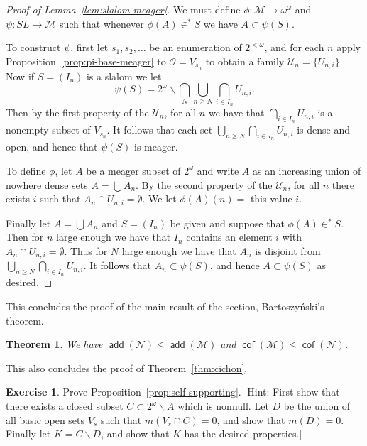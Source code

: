 \documentclass[11pt,oneside]{amsbook}
\newcommand{\Null}{\mathcal N}
\newcommand{\Meager}{\mathcal M}
\DeclareMathOperator{\add}{\mathsf{add}}
\DeclareMathOperator{\cof}{\mathsf{cof}}
\theoremstyle{definition}
\newtheorem{exercise}{Exercise}[section]
\theoremstyle{plain}
\newtheorem{theorem}{Theorem}[section]
\theoremstyle{definition}
\theoremstyle{remark}
\numberwithin{equation}{section}
\numberwithin{figure}{section}
\begin{document}
\begin{proof}[Proof of Lemma~\ref{lem:slalom-meager}]
  We must define $\phi\colon\Meager\to\omega^\omega$ and $\psi\colon SL\to\Meager$ such that whenever $\phi(A)\in^*S$ we have $A\subset\psi(S)$.

  To construct $\psi$, first let $s_1,s_2,\ldots$ be an enumeration of $2^{<\omega}$, and for each $n$ apply Proposition~\ref{prop:pi-base-meager} to $\mathcal O=V_{s_n}$ to obtain a family $\mathcal U_n=\{U_{n,i}\}$. Now if $S=(I_n)$ is a slalom we let
  \[\psi(S)=2^\omega\smallsetminus\bigcap_N\bigcup_{n\geq N}\bigcap_{i\in I_n}U_{n,i}\text{.}
  \]
  Then by the first property of the $\mathcal U_n$, for all $n$ we have that $\bigcap_{i\in I_n}U_{n,i}$ is a nonempty subset of $V_{s_n}$. It follows that each set $\bigcup_{n\geq N}\bigcap_{i\in I_n}U_{n,i}$ is dense and open, and hence that $\psi(S)$ is meager.

  To define $\phi$, let $A$ be a meager subset of $2^\omega$ and write $A$ as an increasing union of nowhere dense sets $A=\bigcup A_n$. By the second property of the $\mathcal U_n$, for all $n$ there exists $i$ such that $A_n\cap U_{n,i}=\emptyset$. We let $\phi(A)(n)=$ this value $i$.

  Finally let $A=\bigcup A_n$ and $S=(I_n)$ be given and suppose that $\phi(A)\in^*S$. Then for $n$ large enough we have that $I_n$ contains an element $i$ with $A_n\cap U_{n,i}=\emptyset$. Thus for $N$ large enough we have that $A_n$ is disjoint from $\bigcup_{n\geq N}\bigcap_{i\in I_n}U_{n,i}$. It follows that $A_n\subset\psi(S)$, and hence $A\subset\psi(S)$ as desired.
\end{proof}

This concludes the proof of the main result of the section, Bartoszy\'nski's theorem.

\begin{theorem}
  We have $\add(\Null)\leq\add(\Meager)$ and $\cof(\Meager)\leq\cof(\Null)$.
\end{theorem}

This also concludes the proof of Theorem~\ref{thm:cichon}.

\begin{exercise}
  \label{exerc:self-supporting}
  Prove Proposition~\ref{prop:self-supporting}. [Hint: First show that there exists a closed subset $C\subset2^\omega\smallsetminus A$ which is nonnull. Let $D$ be the union of all basic open sets $V_s$ such that $m(V_s\cap C)=0$, and show that $m(D)=0$. Finally let $K=C\smallsetminus D$, and show that $K$ has the desired properties.]
\end{exercise}
\end{document}
